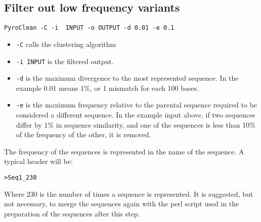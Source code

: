 \documentclass[12pt]{article}
\begin{document}
\subsection{Filter out low frequency variants}
\begin{verbatim}
PyroClean -C -i  INPUT -o OUTPUT -d 0.01 -e 0.1
\end{verbatim}
\begin{itemize}
\item \verb|-C| calls the clustering algorithm
\item \verb|-i INPUT| is the filtered output. 
 \item \verb|-d| is the maximum divergence to the most represented sequence.  In the example 0.01 means 1\%, or 1 mismatch for each 100 bases. 
  \item \verb|-e| is the maximum frequency relative to the parental sequence required to be considered a different sequence.  In the example input above, if two sequences differ by 1\% in sequence similarity, and one of the sequences is less than 10\% of the frequency of the other, it is removed. 
   \end{itemize}

The frequency of the sequences is represented in the name of the sequence. A typical header will be:
\begin{verbatim}
>Seq1_230
\end{verbatim}
Where 230 is the number of times a sequence is represented.  It is suggested, but not necessary, to merge the sequences again with the  perl script used in the preparation of the sequences after this step. 
\end{document}
